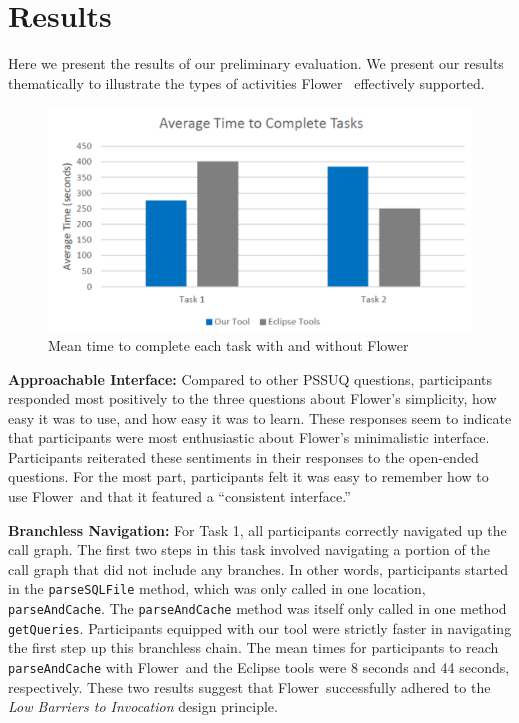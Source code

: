 \documentclass[conference]{IEEEtran}
\newcommand{\toolName}{Flower}
\begin{document}
\section{Results}
Here we present the results of our preliminary evaluation. 
We present our results thematically to illustrate the types of activities \toolName~ effectively supported.

\begin{figure}
	\centering
	\includegraphics[width=\columnwidth]{images/taskTime}
	\caption{Mean time to complete each task with and without \toolName}
	\label{fig:taskTime} 
\end{figure}

\textbf{Approachable Interface:}
Compared to other PSSUQ questions, participants responded most positively to the three questions about \toolName's simplicity, how easy it was to use, and how easy it was to learn. 
These responses seem to indicate that participants were most enthusiastic about \toolName's minimalistic interface. 
Participants reiterated these sentiments in their responses to the open-ended questions. 
For the most part, participants felt it was easy to remember how to use \toolName~and that it featured a ``consistent interface.''

\textbf{Branchless Navigation:}
For Task 1, all participants correctly navigated up the call graph.
The first two steps in this task involved navigating a portion of the call graph that did not include any branches.
In other words, participants started in the \texttt{parseSQLFile} method, which was only called in one location, \texttt{parseAndCache}. 
The \texttt{parseAndCache} method was itself only called in one method \texttt{getQueries}.
Participants equipped with our tool were strictly faster in navigating the first step up this branchless chain. 
The mean times for participants to reach \texttt{parseAndCache} with \toolName~and the Eclipse tools were 8 seconds and 44 seconds, respectively.
These two results suggest that \toolName~successfully adhered to the \textit{Low Barriers to Invocation} design principle. 
\end{document}
